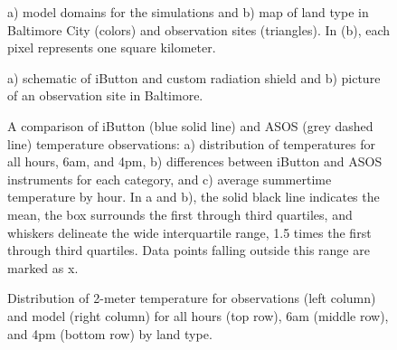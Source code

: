 \begin{figure}[h]
\centering
\caption{a) model domains for the simulations and b) map of land type in Baltimore City (colors) and observation sites (triangles). In (b), each pixel represents one square kilometer.}
\label{fig:map}
 \end{figure}
 
 \begin{figure}[h]
\centering
\caption{a) schematic of iButton and custom radiation shield and b) picture of an observation site in Baltimore.}
\label{fig:ibutton}
 \end{figure}
 
\begin{figure}[h]
\centering
\caption{A comparison of iButton (blue solid line) and ASOS (grey dashed line) temperature observations: a) distribution of temperatures for all hours,  6am, and 4pm, b) differences between iButton and ASOS instruments for each category, and c) average summertime temperature by hour. In a and b), the solid black line indicates the mean, the box surrounds the first through third quartiles, and whiskers delineate the wide interquartile range, 1.5 times the first through third quartiles. Data points falling outside this range are marked as x. }
\label{fig:bias}
\end{figure}



\begin{figure}[h]
\centering
\caption{Distribution of 2-meter temperature for observations (left column) and model (right column) for all hours (top row), 6am (middle row), and 4pm (bottom row) by land type. }
\label{fig:hist}
\end{figure}


